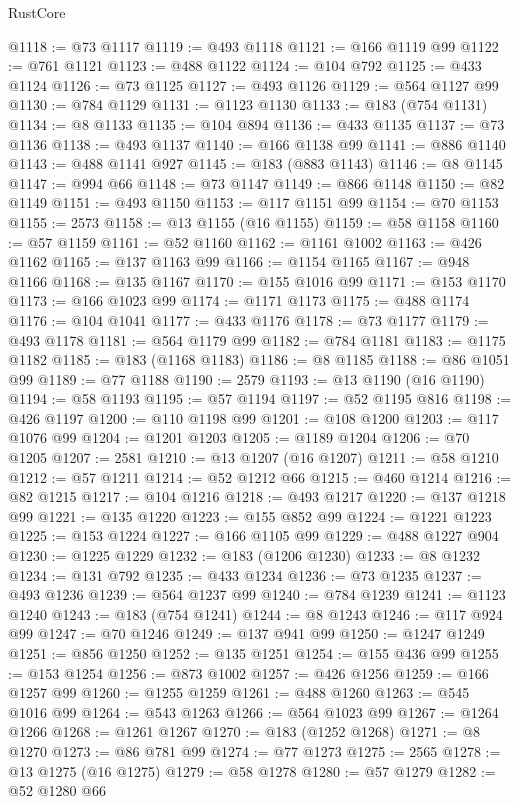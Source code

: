\begin{lexlean}{RustCore}
\begin{coremodule}
@1118 := @73 @1117
@1119 := @493 @1118
@1121 := @166 @1119 @99
@1122 := @761 @1121
@1123 := @488 @1122
@1124 := @104 @792
@1125 := @433 @1124
@1126 := @73 @1125
@1127 := @493 @1126
@1129 := @564 @1127 @99
@1130 := @784 @1129
@1131 := @1123 @1130
@1133 := @183 (@754 @1131)
@1134 := @8 @1133
@1135 := @104 @894
@1136 := @433 @1135
@1137 := @73 @1136
@1138 := @493 @1137
@1140 := @166 @1138 @99
@1141 := @886 @1140
@1143 := @488 @1141 @927
@1145 := @183 (@883 @1143)
@1146 := @8 @1145
@1147 := @994 @66
@1148 := @73 @1147
@1149 := @866 @1148
@1150 := @82 @1149
@1151 := @493 @1150
@1153 := @117 @1151 @99
@1154 := @70 @1153
@1155 := 2573
@1158 := @13 @1155 (@16 @1155)
@1159 := @58 @1158
@1160 := @57 @1159
@1161 := @52 @1160
@1162 := @1161 @1002
@1163 := @426 @1162
@1165 := @137 @1163 @99
@1166 := @1154 @1165
@1167 := @948 @1166
@1168 := @135 @1167
@1170 := @155 @1016 @99
@1171 := @153 @1170
@1173 := @166 @1023 @99
@1174 := @1171 @1173
@1175 := @488 @1174
@1176 := @104 @1041
@1177 := @433 @1176
@1178 := @73 @1177
@1179 := @493 @1178
@1181 := @564 @1179 @99
@1182 := @784 @1181
@1183 := @1175 @1182
@1185 := @183 (@1168 @1183)
@1186 := @8 @1185
@1188 := @86 @1051 @99
@1189 := @77 @1188
@1190 := 2579
@1193 := @13 @1190 (@16 @1190)
@1194 := @58 @1193
@1195 := @57 @1194
@1197 := @52 @1195 @816
@1198 := @426 @1197
@1200 := @110 @1198 @99
@1201 := @108 @1200
@1203 := @117 @1076 @99
@1204 := @1201 @1203
@1205 := @1189 @1204
@1206 := @70 @1205
@1207 := 2581
@1210 := @13 @1207 (@16 @1207)
@1211 := @58 @1210
@1212 := @57 @1211
@1214 := @52 @1212 @66
@1215 := @460 @1214
@1216 := @82 @1215
@1217 := @104 @1216
@1218 := @493 @1217
@1220 := @137 @1218 @99
@1221 := @135 @1220
@1223 := @155 @852 @99
@1224 := @1221 @1223
@1225 := @153 @1224
@1227 := @166 @1105 @99
@1229 := @488 @1227 @904
@1230 := @1225 @1229
@1232 := @183 (@1206 @1230)
@1233 := @8 @1232
@1234 := @131 @792
@1235 := @433 @1234
@1236 := @73 @1235
@1237 := @493 @1236
@1239 := @564 @1237 @99
@1240 := @784 @1239
@1241 := @1123 @1240
@1243 := @183 (@754 @1241)
@1244 := @8 @1243
@1246 := @117 @924 @99
@1247 := @70 @1246
@1249 := @137 @941 @99
@1250 := @1247 @1249
@1251 := @856 @1250
@1252 := @135 @1251
@1254 := @155 @436 @99
@1255 := @153 @1254
@1256 := @873 @1002
@1257 := @426 @1256
@1259 := @166 @1257 @99
@1260 := @1255 @1259
@1261 := @488 @1260
@1263 := @545 @1016 @99
@1264 := @543 @1263
@1266 := @564 @1023 @99
@1267 := @1264 @1266
@1268 := @1261 @1267
@1270 := @183 (@1252 @1268)
@1271 := @8 @1270
@1273 := @86 @781 @99
@1274 := @77 @1273
@1275 := 2565
@1278 := @13 @1275 (@16 @1275)
@1279 := @58 @1278
@1280 := @57 @1279
@1282 := @52 @1280 @66

\end{coremodule}
\end{lexlean}
